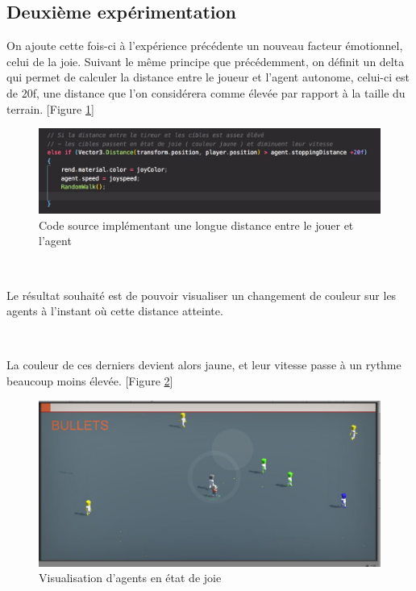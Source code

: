 \subsection{Deuxième expérimentation}

On ajoute cette fois-ci à l'expérience précédente un nouveau facteur émotionnel, celui de la joie.
Suivant le même principe que précédemment, on définit un delta qui permet de calculer la distance entre le joueur et l’agent autonome, celui-ci est de 20f, une distance que l'on considérera comme élevée par rapport à la taille du terrain. [Figure \ref{fig:fonct2}]

\begin{figure}[th]
\centering
\includegraphics{Figures/fonct2.JPG}
\decoRule
\caption[Code source implémentant une longue distance]{Code source implémentant une longue distance entre le jouer et l'agent}
\label{fig:fonct2}
\end{figure}



~\par
Le résultat souhaité est de pouvoir visualiser un changement de couleur sur les agents à l’instant où cette distance atteinte.

~\par
La couleur de ces derniers devient alors jaune, et leur vitesse passe à un rythme beaucoup moins élevée. [Figure \ref{fig:bichi2}]

\begin{figure}[th]
\centering
\includegraphics{Figures/bichi2.JPG}
\decoRule
\caption[Visualisation d'agents en état de joie]{Visualisation d'agents en état de joie}
\label{fig:bichi2}
\end{figure}


